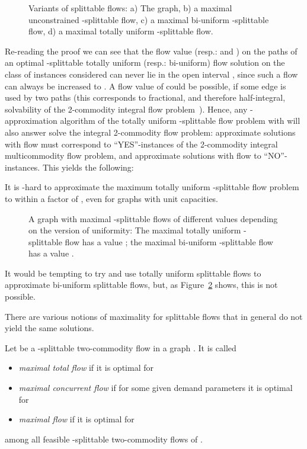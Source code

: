 \begin{figure}
  \centering

  \caption{Variants of splittable flows: a) The graph, b) a maximal unconstrained -splittable flow, c) a maximal bi-uniform -splittable flow, d) a maximal totally uniform -splittable flow.}
  \label{fig:intro}
\end{figure}
Re-reading the proof we can see that the flow value  (resp.: 
and ) on the paths
of an optimal -splittable totally uniform (resp.: bi-uniform) flow
solution on the class of instances considered can never lie in the
open interval , since such a flow can always be increased to
. A flow value of  could be possible, if some edge is used by
two paths (this corresponds to fractional, and therefore
half-integral, solvability of the 2-commodity integral flow
problem~\cite{hu:63}). Hence, any -approximation algorithm of
the totally uniform -splittable flow problem with
 will also answer solve the integral 2-commodity flow
problem: approximate solutions with flow  must correspond to
``YES''-instances of the 2-commodity integral multicommodity flow
problem, and approximate solutions with flow  to
``NO''-instances.  This yields the following:

\begin{corollary}\label{lem:0.5-hardness}
  It is \NP-hard to approximate the maximum totally uniform
  -splittable flow problem  to within a
  factor of , even for graphs with unit capacities.
\end{corollary}

\begin{figure}
  \centering
  \caption{A graph with maximal -splittable flows of different
    values depending on the version of uniformity: The  maximal totally uniform -splittable flow has a value
; the maximal bi-uniform -splittable flow has a value 
.}
  \label{fig:uniformity-example}
\end{figure}
It would be tempting to try and use totally uniform splittable flows
to approximate bi-uniform splittable flows, but, as
Figure~\ref{fig:uniformity-example} shows, this is not possible.

\medskip

There are various notions of maximality for splittable flows that
in general do not yield the same solutions.

\begin{definition}
  Let  be a
  -splittable two-commodity flow in a graph . It is called 
  \begin{itemize}
  \item \emph{maximal total flow} if it is optimal for 
    

  \item \emph{maximal concurrent flow} if for some given demand 
    parameters  it is optimal for
    
  \item \emph{maximal flow} if it is 
    optimal for
    
  \end{itemize}
  among all feasible -splittable two-commodity flows of .
\end{definition}

